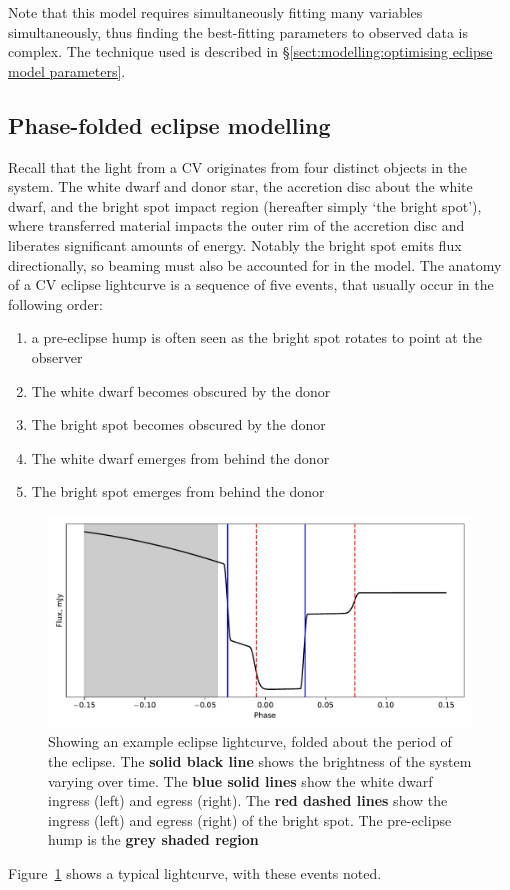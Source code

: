 Note that this model requires simultaneously fitting many variables simultaneously, thus finding the best-fitting parameters to observed data is complex. The technique used is described in \S\ref{sect:modelling:optimising eclipse model parameters}.

\subsection{Phase-folded eclipse modelling}
\label{sect:modelling:eclipse modelling}

Recall that the light from a CV originates from four distinct objects in the system. The white dwarf and donor star, the accretion disc about the white dwarf, and the bright spot impact region (hereafter simply `the bright spot'), where transferred material impacts the outer rim of the accretion disc and liberates significant amounts of energy. Notably the bright spot emits flux directionally, so beaming must also be accounted for in the model.
The anatomy of a CV eclipse lightcurve is a sequence of five events, that usually occur in the following order:
\begin{enumerate}
    \setlength\itemsep{0em}
    \item a pre-eclipse hump is often seen as the bright spot rotates to point at the observer
    \item The white dwarf becomes obscured by the donor
    \item The bright spot becomes obscured by the donor
    \item The white dwarf emerges from behind the donor
    \item The bright spot emerges from behind the donor
\end{enumerate}
\begin{figure}
    \centering
    \includegraphics[width=\textwidth]{figures/introduction/example_eclipse.pdf}
    \caption{Showing an example eclipse lightcurve, folded about the period of the eclipse. The {\bf solid black line} shows the brightness of the system varying over time. The {\bf blue solid lines} show the white dwarf ingress (left) and egress (right). The {\bf red dashed lines} show the ingress (left) and egress (right) of the bright spot. The pre-eclipse hump is the {\bf grey shaded region}}
    \label{fig:introduction:example labelled eclipse lightcurve}
\end{figure}
Figure~\ref{fig:introduction:example labelled eclipse lightcurve} shows a typical lightcurve, with these events noted.

